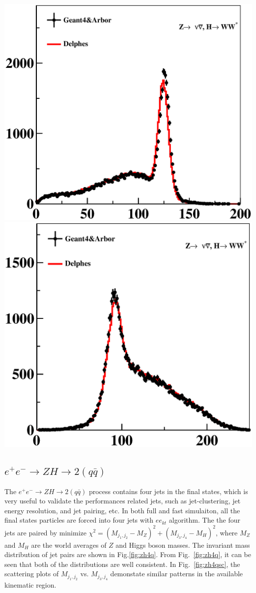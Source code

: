 \documentclass[a4paper,10pt,twoside]{cpc-hepnp}
\begin{document}
\begin{center}
\includegraphics[width=0.4\linewidth]{figs/nnh_mass}
\includegraphics[width=0.4\linewidth]{figs/nnh_reco}
\end{center}

\subsection{$e^+e^- \to ZH \to 2(q\bar{q})$}

The $e^+e^- \to ZH \to 2(q\bar{q})$ process contains four jets in the final states, which is very useful
to validate the performances related jets, such as jet-clustering, jet energy resolution, and jet pairing, etc.
In both full and fast simulaiton, all the final states particles are forced into four jets with $ee_{kt}$ algorithm.
The the four jets are paired by minimize $\chi^2 = (M_{j_1,j_2} - M_Z)^2 + (M_{j_3,j_4}-M_H)^2$,
where $M_Z$ and $M_H$ are the world averages of $Z$ and Higgs boson masses. 
The invariant mass distribution of jet pairs are shown in Fig.\ref{fig:zh4q}.
From Fig.~\ref{fig:zh4q}, it can be seen that both of the distributions are well consistent.
In Fig.~\ref{fig:zh4qsc}, the scattering plots of $M_{j_1,j_2}$  vs. $M_{j_3,j_4}$ 
demonstate similar patterns in the available kinematic region.
\end{document}
